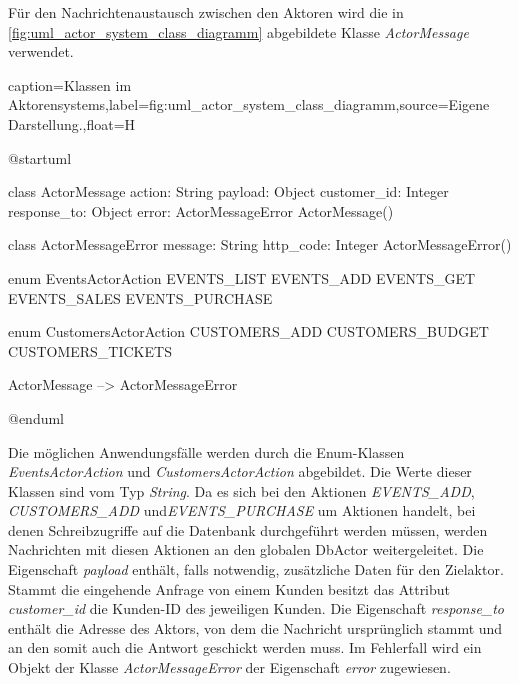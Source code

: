 Für den Nachrichtenaustausch zwischen den Aktoren wird die in \autoref{fig:uml_actor_system_class_diagramm} abgebildete Klasse \textit{ActorMessage} verwendet.

\begin{dhbwfigure}{caption=Klassen im Aktorensystems,label=fig:uml_actor_system_class_diagramm,source={Eigene Darstellung.},float=H}
    \begin{plantuml}
        @startuml

        class ActorMessage {
            action: String
            payload: Object 
            customer_id: Integer
            response_to: Object
            error: ActorMessageError
            ActorMessage()
        }

        class ActorMessageError {
            message: String
            http_code: Integer 
            ActorMessageError()
        }

        enum EventsActorAction {
            EVENTS_LIST
            EVENTS_ADD
            EVENTS_GET
            EVENTS_SALES
            EVENTS_PURCHASE
        }

        enum CustomersActorAction {
            CUSTOMERS_ADD
            CUSTOMERS_BUDGET
            CUSTOMERS_TICKETS
        }

        ActorMessage --> ActorMessageError

        @enduml
    \end{plantuml}
\end{dhbwfigure}\unskip

Die möglichen Anwendungsfälle werden durch die Enum-Klassen \textit{EventsActorAction} und \textit{CustomersActorAction} abgebildet.
Die Werte dieser Klassen sind vom Typ \textit{String}.
Da es sich bei den Aktionen \textit{EVENTS\_ADD}, \textit{CUSTOMERS\_ADD} und\linebreak \textit{EVENTS\_PURCHASE} um Aktionen handelt, bei denen Schreibzugriffe auf die Datenbank durchgeführt werden müssen, werden Nachrichten mit diesen Aktionen an den globalen DbActor weitergeleitet.
Die Eigenschaft \textit{payload} enthält, falls notwendig, zusätzliche Daten für den Zielaktor.
Stammt die eingehende Anfrage von einem Kunden besitzt das Attribut \textit{customer\_id} die Kunden-ID des jeweiligen Kunden.
Die Eigenschaft \textit{response\_to} enthält die Adresse des Aktors, von dem die Nachricht ursprünglich stammt und an den somit auch die Antwort geschickt werden muss.
Im Fehlerfall wird ein Objekt der Klasse \textit{ActorMessageError} der Eigenschaft \textit{error} zugewiesen.
